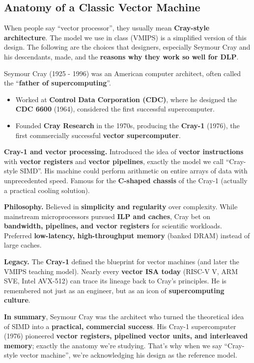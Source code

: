 \subsection{Anatomy of a Classic Vector Machine}

When people say ``vector processor'', they usually mean \textbf{Cray-style architecture}. The model we use in class (VMIPS) is a simplified version of this design. The following are the choices that designers, especially Seymour Cray and his descendants, made, and the \textbf{reasons why they work so well for DLP}.

\begin{deepeningbox}
    Seymour Cray (1925 - 1996) was an American computer architect, often called the ``\textbf{father of supercomputing}''.
    \begin{itemize}
        \item Worked at \textbf{Control Data Corporation (CDC)}, where he designed the \textbf{CDC 6600} (1964), considered the first successful supercomputer.
        \item Founded \textbf{Cray Research} in the 1970s, producing the \textbf{Cray-1} (1976), the first commercially successful \textbf{vector supercomputer}.
    \end{itemize}
    \textbf{Cray-1 and vector processing.} Introduced the idea of \textbf{vector instructions} with \textbf{vector registers} and \textbf{vector pipelines}, exactly the model we call ``Cray-style SIMD''. His machine could perform arithmetic on entire arrays of data with unprecedented speed. Famous for the \textbf{C-shaped chassis} of the Cray-1 (actually a practical cooling solution).

    \highspace
    \textbf{Philosophy.} Believed in \textbf{simplicity and regularity} over complexity. While mainstream microprocessors pursued \textbf{ILP and caches}, Cray bet on \textbf{bandwidth, pipelines, and vector registers} for scientific workloads. Preferred \textbf{low-latency, high-throughput memory} (banked DRAM) instead of large caches.

    \highspace
    \textbf{Legacy.} The \textbf{Cray-1} defined the blueprint for vector machines (and later the VMIPS teaching model). Nearly every \textbf{vector ISA today} (RISC-V V, ARM SVE, Intel AVX-512) can trace its lineage back to Cray's principles. He is remembered not just as an engineer, but as an icon of \textbf{supercomputing culture}.

    \highspace
    \textbf{In summary}, Seymour Cray was the architect who turned the theoretical idea of SIMD into a \textbf{practical, commercial success}. His Cray-1 supercomputer (1976) pioneered \textbf{vector registers, pipelined vector units, and interleaved memory}; exactly the anatomy we're studying. That's why when we say ``Cray-style vector machine'', we're acknowledging his design as the reference model.
\end{deepeningbox}

